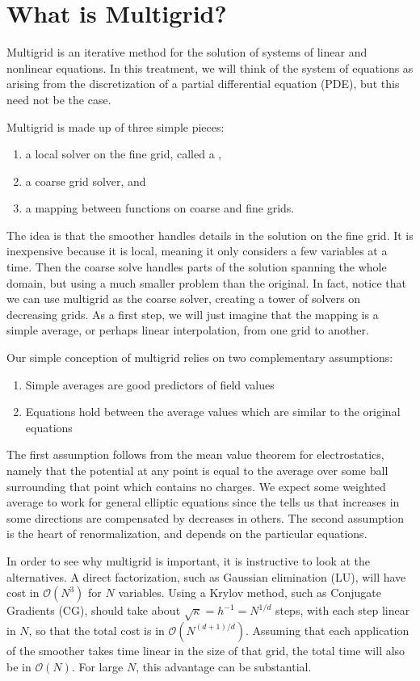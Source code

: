 \chapter{What is Multigrid?}

Multigrid is an iterative method for the solution of systems of linear and nonlinear equations. In this treatment, we will think of the system of equations as arising from the discretization of a partial differential equation (PDE), but this need not be the case.

Multigrid is made up of three simple pieces:
\begin{enumerate}
  \item a local solver on the fine grid, called a ,

  \item a coarse grid solver, and

  \item a mapping between functions on coarse and fine grids.
\end{enumerate}
The idea is that the smoother handles details in the solution on the fine grid. It is inexpensive because it is local, meaning it only considers a few variables at a time. Then the coarse solve handles parts of the solution spanning the whole domain, but using a much smaller problem than the original. In fact, notice that we can use multigrid as the coarse solver, creating a tower of solvers on decreasing grids. As a first step, we will just imagine that the mapping is a simple average, or perhaps linear interpolation, from one grid to another.

Our simple conception of multigrid relies on two complementary assumptions:
\begin{enumerate}
  \item Simple averages are good predictors of field values

  \item Equations hold between the average values which are similar to the original equations
\end{enumerate}
The first assumption follows from the mean value theorem for electrostatics, namely that the potential at any point is equal to the average over some ball surrounding that point which contains no charges. We expect some weighted average to work for general elliptic equations since the  tells us that increases in some directions are compensated by decreases in others. The second assumption is the heart of renormalization, and depends on the particular equations.

In order to see why multigrid is important, it is instructive to look at the alternatives. A direct factorization, such as Gaussian elimination (LU), will have cost in $\mathcal{O}(N^3)$ for $N$ variables. Using a Krylov method, such as Conjugate Gradients (CG), should take about $\sqrt{\kappa} = h^{-1} = N^{1/d}$ steps, with each step linear in $N$, so that the total cost is in $\mathcal{O}(N^{(d+1)/d})$. Assuming that each application of the smoother takes time linear in the size of that grid, the total time will also be in $\mathcal{O}(N)$. For large $N$, this advantage can be substantial.
